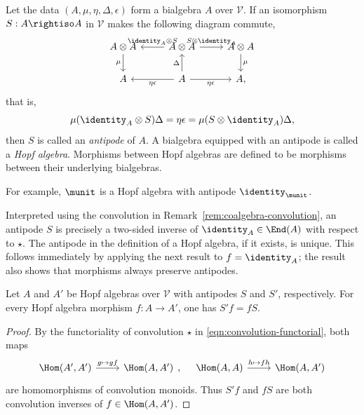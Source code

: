 \begin{definition}\label{def:Hopf-algebra}
	Let the data $(A,\mu,\eta,\Delta,\epsilon)$ form a bialgebra $A$ over
	$\mathcal{V}$. If an isomorphism $S:A\rightiso A$ in $\mathcal{V}$ makes
	the following diagram commute,
	\[\begin{tikzcd}
		A \otimes A \arrow[d, "\mu"'] & A \otimes A \arrow[r, "{S \otimes \identity_A}"] \arrow[l, "{\identity_A \otimes S}"'] & A \otimes A \arrow[d, "\mu"] \\
		A & A \arrow[u, "\Delta"] \arrow[r, "\eta\epsilon"'] \arrow[l, "\eta\epsilon"] & A ,
	\end{tikzcd}\]
	that is,
	\[ \mu (\identity_A \otimes S) \Delta = \eta\epsilon = \mu (S \otimes \identity_A) \Delta, \]
	then $S$ is called an \emph{antipode} of $A$. A bialgebra equipped with an
	antipode is called a \emph{Hopf algebra}. Morphisms between Hopf algebras
	are defined to be morphisms between their underlying bialgebras.
\end{definition}

For example, $\munit$ is a Hopf algebra with antipode
$\identity_{\munit}$.

Interpreted using the convolution in
Remark~\ref{rem:coalgebra-convolution}, an antipode $S$ is precisely a
two-sided inverse of $\identity_A\in\End(A)$ with respect to $\star$. The
antipode in the definition of a Hopf algebra, if it exists, is unique. This
follows immediately by applying the next result to $f=\identity_A$; the
result also shows that morphisms always preserve antipodes.

\begin{proposition}\label{prop:antipode-homo}
	Let $A$ and $A'$ be Hopf algebras over $\mathcal{V}$ with antipodes $S$
	and $S'$, respectively. For every Hopf algebra morphism $f:A\to A'$, one
	has $S'f=fS$.
\end{proposition}

\begin{proof}
	By the functoriality of convolution $\star$ in
	\eqref{eqn:convolution-functorial}, both maps
	\[\begin{tikzcd}
		\Hom(A', A') \arrow[r, "{g \mapsto gf}"] & \Hom(A, A')
	\end{tikzcd}, \quad \begin{tikzcd}
		\Hom(A, A) \arrow[r, "{h \mapsto fh}"] & \Hom(A, A')
	\end{tikzcd}\]
	are homomorphisms of convolution monoids. Thus $S'f$ and $fS$ are both
	convolution inverses of $f\in\Hom(A,A')$.
\end{proof}

